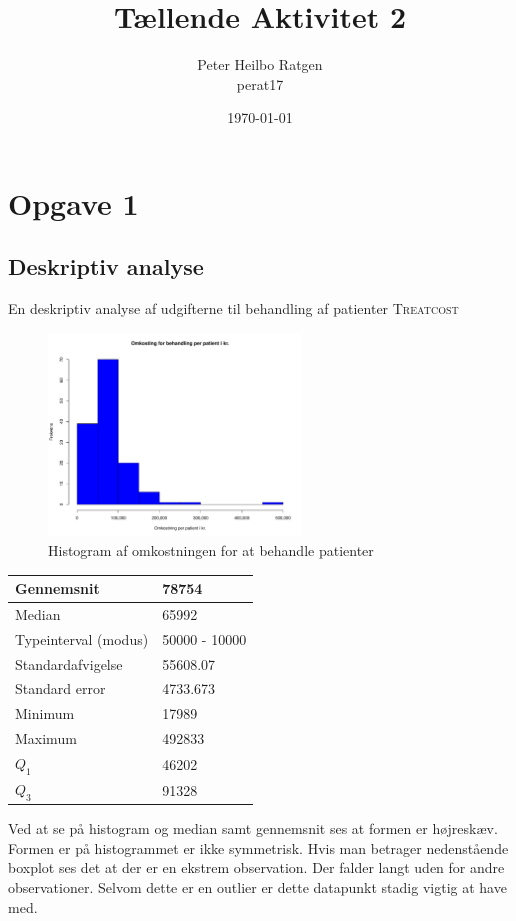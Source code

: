 \documentclass{article}
\title{Tællende Aktivitet 2}
\author{Peter Heilbo Ratgen \\ perat17}
\date{\today}
\begin{document}
\maketitle

\section{Opgave 1}
\subsection{Deskriptiv analyse}
En deskriptiv analyse af udgifterne til behandling af patienter 
\textsc{Treatcost} 

\begin{figure}[h]
  \centering
  \includegraphics[width=0.6\textwidth]{./plots/treatcost.pdf}
  \caption{Histogram af omkostningen for at behandle patienter}
\end{figure}

\begin{table}[H]
  \begin{tabular}{l|l}
    Gennemsnit        &  78754\\\hline
    Median            &  65992 \\\hline
    Typeinterval (modus)     & 50000 - 10000  \\\hline
    Standardafvigelse &  55608.07\\\hline
    Standard error    &  4733.673 \\\hline
    Minimum           & 17989  \\\hline
    Maximum           &  492833 \\\hline
    $Q_1$             &  46202\\\hline
    $Q_3$             & 91328 
  \end{tabular}
\end{table}

Ved at se på histogram og median samt gennemsnit ses at formen er højreskæv.
Formen er på histogrammet er ikke symmetrisk. Hvis man betrager nedenstående
boxplot ses det at der er en ekstrem observation. Der falder langt uden for
andre observationer. Selvom dette er en outlier er dette datapunkt stadig vigtig
at have med.
\end{document}
